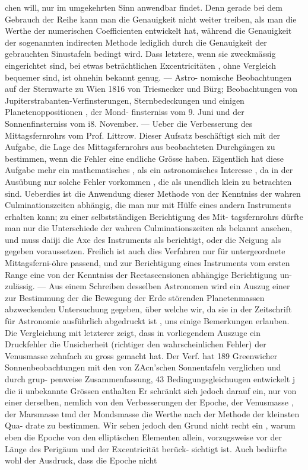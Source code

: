 \documentclass[12pt,a4paper]{article}
\begin{document}
{{{{{{{{chen  will,  nur  im  umgekehrten  Sinn  anwendbar  findet.  Denn  gerade  bei  dem  Gebrauch  der  Reihe  kann man  die  Genauigkeit  nicht  weiter  treiben,  als  man  die  Werthe  der  numerischen  Coefficienten  entwickelt hat,  während  die  Genauigkeit  der  sogenannten  indirecten  Methode  lediglich  durch  die  Genauigkeit  der gebrauchten  Sinustafeln  bedingt  wird.  Dass  letztere,  wenn  sie  zweckmässig  eingerichtet  sind,  bei  etwas beträchtlichen  Excentricitäten ,  ohne  Vergleich  bequemer  sind,  ist  ohnehin  bekannt  genug.  ---  Astro- nomische Beobachtungen  auf  der  Sternwarte  zu  Wien  1816  von  Triesnecker  und  Bürg;  Beobachtungen von  Jupiterstrabanten-Verfinsterungen,  Sternbedeckungen  und  einigen  Planetenoppositionen ,  der  Mond- finsterniss  vom  9.  Juni  und  der  Sonnenfinsterniss  vom  i8.  November.  ---  Ueber  die  Verbesserung  des Mittagsfernrohrs  vom  Prof.  Littrow.  Dieser  Aufsatz  beschäftigt  sich  mit  der  Aufgabe,  die  Lage  des Mittagsfernrohrs  aus  beobachteten  Durchgängen  zu  bestimmen,  wenn  die  Fehler  eine  endliche  Grösse haben.  Eigentlich  hat  diese  Aufgabe  mehr  ein  mathematisches ,  als  ein  astronomisches  Interesse ,  da  in der  Ausübung  nur  solche  Fehler  vorkommen ,  die  als  unendlich  klein  zu  betrachten  sind.  Ueberdies  ist die  Anwendung  dieser  Methode  von  der  Kenntniss  der  wahren  Culminationszeiten  abhängig,  die  man nur  mit  Hülfe  eines  andern  Instruments  erhalten  kann;  zu  einer  selbstständigen  Berichtigung  des  Mit- tagsfernrohrs dürfte  man  nur  die  Unterschiede  der  wahren  Culminationszeiten  als  bekannt  ansehen,  und muss  daiiji  die  Axe  des  Instruments  als  berichtigt,  oder  die  Neigung  als  gegeben  voraussetzen.  Freilich ist  auch  dies  Verfahren  nur  für  untergeordnete  Mittagsferni-öhre  passend,  und  zur  Berichtigung  eines Instruments  vom  ersten  Range  eine  von  der  Kenntniss  der  Rectascensionen  abhängige  Berichtigung  un- zulässig. ---  Aus  einem  Schreiben  desselben  Astronomen  wird  ein  Auszug  einer  zur  Bestimmung  der  die Bewegung  der  Erde  störenden  Planetenmassen  abzweckenden  Untersuchung  gegeben,  über  welche  wir, da  sie  in  der  Zeitschrift  für  Astronomie  ausführlich  abgedruckt  ist ,  uns  einige  Bemerkungen  erlauben. Die  Vergleichung  mit  letzterer  zeigt,  dass  in  vorliegendem  Auszuge  ein  Druckfehler  die  Unsicherheit (richtiger  den  wahrscheinlichen  Fehler)  der  Venusmasse  zehnfach  zu  gross  gemacht  hat.  Der  Verf.  hat 189  Greenwicher  Sonnenbeobachtungen  mit  den  von  ZAcn'schen  Sonnentafeln  verglichen  und  durch  grup- penweise Zusammenfassung,  43  Bedingungsgleichuugen  entwickelt j  die  ii  unbekannte  Grössen  enthalten Er  schränkt  sich  jedoch  darauf  ein,  nur  von  einer  derselben,  nemlich  von  den  Verbesserungen  der  Epoche, der  Venusmasse ,  der  Marsmasse  tmd  der  Mondsmasse  die  Werthe  nach  der  Methode  der  kleinsten  Qua- drate zu  bestimmen.  Wir  sehen  jedoch  den  Grund  nicht  recht  ein ,  warum  eben  die  Epoche  von  den elliptischen  Elementen  allein,  vorzugsweise  vor  der  Länge  des  Perigäum  und  der  Excentricität  berück- sichtigt ist.  Auch  bedürfte  wohl  der  Ausdruck,  dass  die  Epoche  nicht  }}}}}}}}
\end{document}
